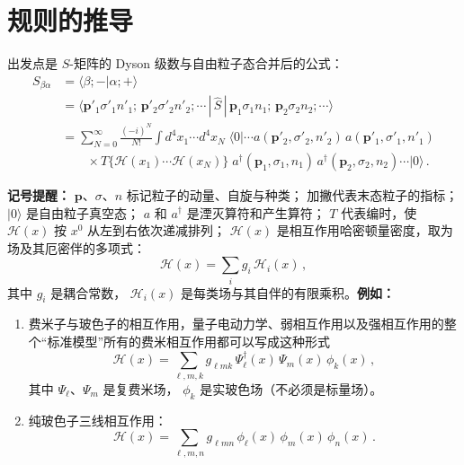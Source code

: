 \section{规则的推导}\label{sec:derivation-rules}

出发点是 $S$-矩阵的 Dyson 级数与自由粒子态合并后的公式：
\begin{align}
S_{\beta\alpha} &= \langle \beta;-|\alpha;+\rangle \nonumber\\
&= \langle \boldsymbol{p}'_1\sigma'_1 n'_1;\,\boldsymbol{p}'_2\sigma'_2 n'_2;\cdots
\,|\,\hat{S}\,|\,\boldsymbol{p}_1\sigma_1 n_1;\,\boldsymbol{p}_2\sigma_2 n_2;\cdots\rangle \nonumber\\
&= \sum_{N=0}^{\infty}\frac{(-i)^N}{N!}
\int d^4x_1\cdots d^4x_N\;
\Big\langle 0\Big|\cdots a(\boldsymbol{p}'_2,\sigma'_2,n'_2)\,a(\boldsymbol{p}'_1,\sigma'_1,n'_1) \nonumber\\
&\qquad\times T\!\big\{\mathscr{H}(x_1)\cdots\mathscr{H}(x_N)\big\}\;
a^\dagger(\boldsymbol{p}_1,\sigma_1,n_1)\,a^\dagger(\boldsymbol{p}_2,\sigma_2,n_2)\cdots\Big|0\Big\rangle \,.
\label{eq:S-Dyson}
\end{align}

\noindent\textbf{记号提醒：}
$\boldsymbol{p}$、$\sigma$、$n$ 标记粒子的动量、自旋与种类；
加撇代表末态粒子的指标；
$|0\rangle$ 是自由粒子真空态；
$a$ 和 $a^\dagger$ 是湮灭算符和产生算符；
$T$ 代表编时，使 $\mathscr{H}(x)$ 按 $x^0$ 从左到右依次递减排列；
$\mathscr{H}(x)$ 是相互作用哈密顿量密度，取为场及其厄密伴的多项式：
\begin{equation}
\mathscr{H}(x) = \sum_i g_i\,\mathscr{H}_i(x)\,,
\label{eq:H-sum}
\end{equation}
其中 $g_i$ 是耦合常数，
$\mathscr{H}_i(x)$ 是每类场与其自伴的有限乘积。\textbf{例如：}
\begin{enumerate}
\item[\textbf{I.}]
  费米子与玻色子的相互作用，量子电动力学、弱相互作用以及强相互作用的整个``标准模型''所有的费米相互作用都可以写成这种形式
  \begin{equation}
  \mathscr{H}(x) = \sum_{\ell,m,k}g_{\ell mk}\,
    \Psi^\dagger_\ell(x)\,\Psi_m(x)\,\phi_k(x)\,,
  \label{eq:H-I}
  \end{equation}
  其中 $\Psi_\ell$、$\Psi_m$ 是复费米场，
  $\phi_k$ 是实玻色场（不必须是标量场）。

\item[\textbf{II.}]
  纯玻色子三线相互作用：
  \begin{equation}
  \mathscr{H}(x) = \sum_{\ell,m,n}g_{\ell mn}\,
    \phi_\ell(x)\,\phi_m(x)\,\phi_n(x)\,.
  \label{eq:H-II}
  \end{equation}
\end{enumerate}

